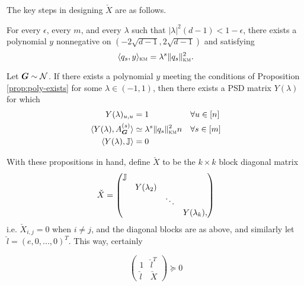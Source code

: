 The key steps in designing $\check X$ are as follows.
%
\begin{proposition} \label{prop:poly-exists}
    For every $\epsilon$, every $m$, and every $\lambda$ such that $|\lambda|^2(d-1) < 1 - \epsilon$, there exists a polynomial $y$ nonnegative on $(-2\sqrt{d-1},2\sqrt{d-1})$ and satisfying
    $$
        \langle q_s,y \rangle_{\textsc{km}} = \lambda^s\|q_s\|^2_{\textsc{km}}.
    $$
\end{proposition}
\begin{proposition} \label{prop:mat-exists}
    Let $\boldsymbol{G} \sim \mathcal{N}$. If there exists a polynomial $y$ meeting the conditions of Proposition \ref{prop:poly-exists} for some $\lambda \in (-1,1)$, then there exists a PSD matrix $Y(\lambda)$ for which
    \begin{align*}
        Y(\lambda)_{u,u} &= 1 & & \forall u\in[n] \\
         \langle Y(\lambda), A^{(s)}_{\boldsymbol{G}} \rangle &\simeq \lambda^s \|q_s\|^2_{\textsc{km}}n & & \forall s \in[m] \\
         \langle Y(\lambda),\mathbb{J} \rangle &= 0
    \end{align*}
\end{proposition}

\noindent With these propositions in hand, define $\check X$ to be the $k\times k$ block diagonal matrix
$$
    \check X = \begin{pmatrix} 
        \mathbb{J} & & & \\
           &Y(\lambda_2)& & \\
           & &\ddots & \\
           & & & Y(\lambda_k),
    \end{pmatrix}
$$
i.e. $\check X_{i,j} = 0$ when $i\neq j$, and the diagonal blocks are as above, and similarly let $\check l = (e,0,...,0)^T$. This way, certainly 

\begin{equation}
    \begin{pmatrix} 1 & \check l^T \\ \check l & \check X \end{pmatrix} \succeq 0  
\end{equation}
 
